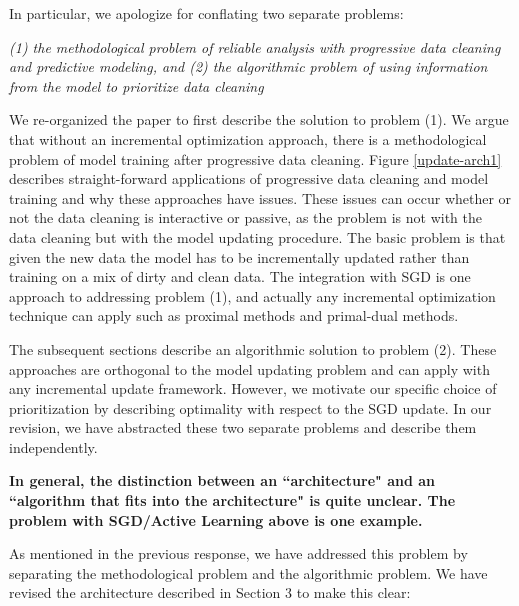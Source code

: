 In particular, we apologize for conflating two separate problems:

\vspace{0.25em}

\emph{(1) the methodological problem of reliable analysis with progressive data cleaning and predictive modeling, and (2) the algorithmic problem of using information from the model to prioritize data cleaning} 

\vspace{0.25em}

We re-organized the paper to first describe the solution to problem (1). We argue that without an incremental optimization approach, there is a methodological problem of model training after progressive data cleaning. Figure \ref{update-arch1} describes straight-forward applications of progressive data cleaning and model training and why these approaches have issues.
These issues can occur whether or not the data cleaning is interactive or passive, as the problem is not with the data cleaning but with the model updating procedure.
The basic problem is that given the new data the model has to be incrementally updated rather than training on a mix of dirty and clean data.
The integration with SGD is one approach to addressing problem (1), and actually any incremental optimization technique can apply such as proximal methods and primal-dual methods.


The subsequent sections describe an algorithmic solution to problem (2). These approaches are orthogonal to the model updating problem and can apply with any incremental update framework. However, we motivate our specific choice of prioritization by describing optimality with respect to the SGD update.
In our revision, we have abstracted these two separate problems and describe them independently.


\vspace{0.25em}

\textbf{In general, the distinction between an ``architecture" and an ``algorithm that fits into the architecture" is quite unclear. The problem with SGD/Active Learning above is one example.}

As mentioned in the previous response, we have addressed this problem by separating the methodological problem and the algorithmic problem. We have revised the architecture described in Section 3 to make this clear:

